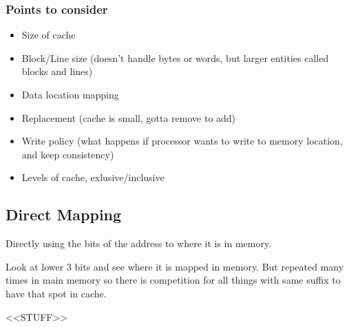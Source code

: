 \documentclass{article}
\begin{document}
		\subsubsection*{Points to consider}
		\begin{itemize}
			\item Size of cache
			\item Block/Line size (doesn't handle bytes or words, but larger entities called blocks and lines)
			\item Data location mapping
			\item Replacement (cache is small, gotta remove to add)
			\item Write policy (what happens if processor wants to write to memory location, and keep consistency)
			\item Levels of cache, exlusive/inclusive
		\end{itemize}

	\subsection*{Direct Mapping}
		Directly using the bits of the address to where it is in memory.

		Look at lower 3 bits and see where it is mapped in memory. But repeated many times in main memory so there is competition for all things with same suffix to have that spot in cache.

	<<STUFF>>







			
\end{document}
